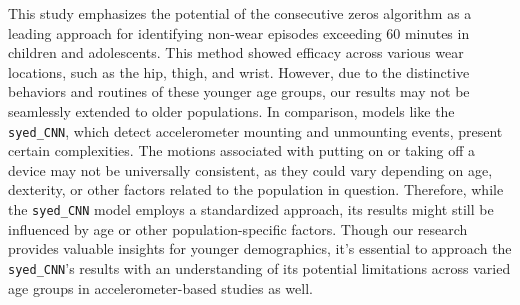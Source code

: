 \documentclass[
  10pt,
]{scrbook}
\begin{document}
This study emphasizes the potential of the consecutive zeros algorithm
as a leading approach for identifying non-wear episodes exceeding 60
minutes in children and adolescents. This method showed efficacy across
various wear locations, such as the hip, thigh, and wrist. However, due
to the distinctive behaviors and routines of these younger age groups,
our results may not be seamlessly extended to older populations. In
comparison, models like the \texttt{syed\_CNN}, which detect
accelerometer mounting and unmounting events, present certain
complexities. The motions associated with putting on or taking off a
device may not be universally consistent, as they could vary depending
on age, dexterity, or other factors related to the population in
question. Therefore, while the \texttt{syed\_CNN} model employs a
standardized approach, its results might still be influenced by age or
other population-specific factors. Though our research provides valuable
insights for younger demographics, it's essential to approach the
\texttt{syed\_CNN}'s results with an understanding of its potential
limitations across varied age groups in accelerometer-based studies as
well.
\end{document}
